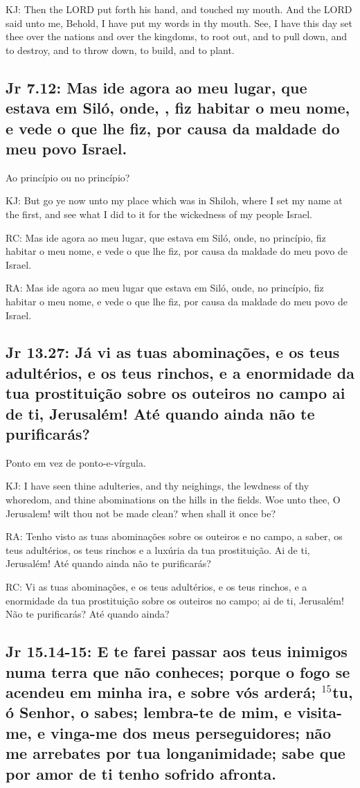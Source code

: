 KJ: Then the LORD put forth his hand, and touched my mouth. And the LORD said unto me, Behold, I have put my words in thy mouth. See, I have this day set thee over the nations and over the kingdoms, to root out, and to pull down, and to destroy, and to throw down, to build, and to plant.

\subsection{Jr 7.12: Mas ide agora ao meu lugar, que estava em Siló, onde, , fiz habitar o meu nome, e vede o que lhe fiz, por causa da maldade do meu povo Israel.}
Ao princípio  ou no princípio?

KJ: But go ye now unto my place which was in Shiloh, where I set my name at the first, and see what I did to it for the wickedness of my people Israel.

RC: Mas ide agora ao meu lugar, que estava em Siló, onde, no princípio, fiz habitar o meu nome, e vede o que lhe fiz, por causa da maldade do meu povo de Israel.

RA: Mas ide agora ao meu lugar que estava em Siló, onde, no princípio, fiz habitar o meu nome, e vede o que lhe fiz, por causa da maldade do meu povo de Israel.

\subsection{Jr 13.27: Já vi as tuas abominações, e os teus adultérios, e os teus rinchos, e a enormidade da tua prostituição sobre os outeiros no campo\uwave{;} ai de ti, Jerusalém! Até quando ainda não te purificarás?}

Ponto em vez de ponto-e-vírgula.

KJ: I have seen thine adulteries, and thy neighings, the lewdness of thy whoredom, and thine abominations on the hills in the fields. Woe unto thee, O Jerusalem! wilt thou not be made clean? when shall it once be?

RA: Tenho visto as tuas abominações sobre os outeiros e no campo, a saber, os teus adultérios, os teus rinchos e a luxúria da tua prostituição. Ai de ti, Jerusalém! Até quando ainda não te purificarás?

RC: Vi as tuas abominações, e os teus adultérios, e os teus rinchos, e a enormidade da tua prostituição sobre os outeiros no campo; ai de ti, Jerusalém! Não te purificarás? Até quando ainda?

\subsection{Jr 15.14-15: E te farei passar aos teus inimigos numa terra que não conheces; porque o fogo se acendeu em minha ira, e sobre vós arderá; $^{\mathrm{15}}$tu, ó Senhor, o sabes; lembra-te de mim, e visita-me, e vinga-me dos meus perseguidores; não me arrebates por tua longanimidade; sabe que por amor de ti tenho sofrido afronta.}

